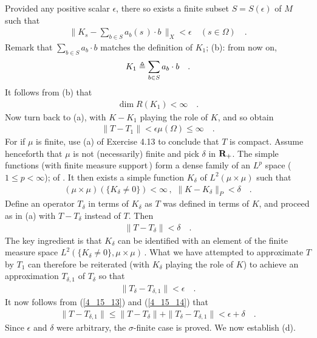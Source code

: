 Provided any positive scalar $\epsilon$, there so exists a finite subset $S=S(\epsilon)$ of $M$ such that
\begin{align}
\| K_s - \sum_{b\in S} a_b(s\,) \cdot b\,\|_X < \epsilon \quad  (s\in \Omega)\quad .
\end{align}
Remark that $\underset{b\in S}{\sum} a_b \cdot b$ matches the definition of $K_1$; \cf(b): from now on, 
\begin{align}
K_1\triangleq \sum_{b\in S} a_b \cdot b\quad .
\end{align}
It follows from (b) that
\begin{align}
\dim R(K_1) < \infty \quad.
\end{align}
Now turn back to (a), with $K-K_1$ playing the role of $K$, and so obtain
\begin{align}
\|T-T_1\| < \epsilon \mu(\Omega)\leq \infty \quad .
\end{align}
For if $\mu$ is finite, use (a) of Exercise 4.13 to conclude that $T$ is compact. Assume henceforth that $\mu$ is not (necessarily) finite and pick $\delta$ in ${\mathbf R}_+$. The simple functions (with finite measure support\,) form a dense family of an $L^p$ space ($1\leq p<\infty$);  of \cite{Big_Rudin}. It then exists a simple function $K_\delta$ of $L^2(\mu\times \mu)$ such that 
\begin{align}
(\mu\times\mu)\left(\{K_\delta\neq 0\}\right) <\infty \,, \,\, \| K-K_\delta \|_P <\delta\quad .
\end{align}
Define an operator $T_\delta$ in terms of $K_\delta$ as $T$ was defined in terms of $K$, and proceed as in (a) with $T-T_\delta$ instead of $T$. Then
\begin{align}\label{4_15_13}
\|T-T_\delta\| < \delta\quad .
\end{align}
The key ingredient is that $K_\delta$ can be identified with an element of the finite measure space $L^2(\{K_\delta\neq 0\},\mu\times\mu)\,$. What we have attempted to approximate $T$ by $T_1$ can therefore be reiterated (with $K_\delta$ playing the role of $K$) to achieve an approximation $T_{\delta,1}$ of $T_\delta$ so that
\begin{align}\label{4_15_14}
\|T_{\delta}-T_{\delta,1}\| < \epsilon\quad .
\end{align}
It now follows from (\ref{4_15_13}) and (\ref{4_15_14}) that
\begin{align}
\|T-T_{\delta,1}\|\leq \|T-T_{\delta}\| +\|T_{\delta}-T_{\delta,1}\| < \epsilon+\delta\quad .
\end{align}
Since $\epsilon$ and $\delta$ were arbitrary, the $\sigma$-finite case is proved. We now establish (d).\\
